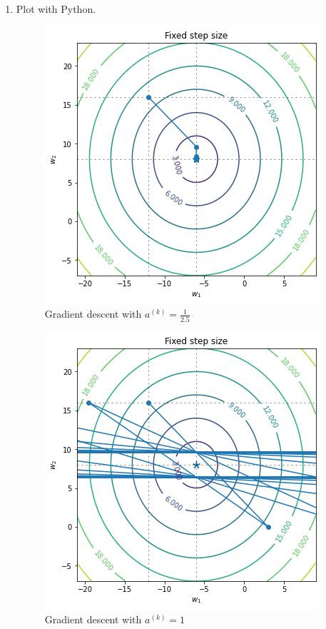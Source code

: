 \documentclass[10pt]{article}
\begin{document}
\begin{enumerate}[1)]
\item
Plot with Python.\\
\begin{figure}[H]
  \centering
  \includegraphics[scale=0.6]{p43a.png}
  \caption{Gradient descent with $a^{(k)}=\frac{1}{2.5}$}
\end{figure}
\begin{figure}[H]
  \centering
  \includegraphics[scale=0.6]{p43b.png}
  \caption{Gradient descent with $a^{(k)}=1$}
\end{figure}
\begin{figure}[H]
  \centering

\end{figure}
\end{enumerate}
\end{document}

